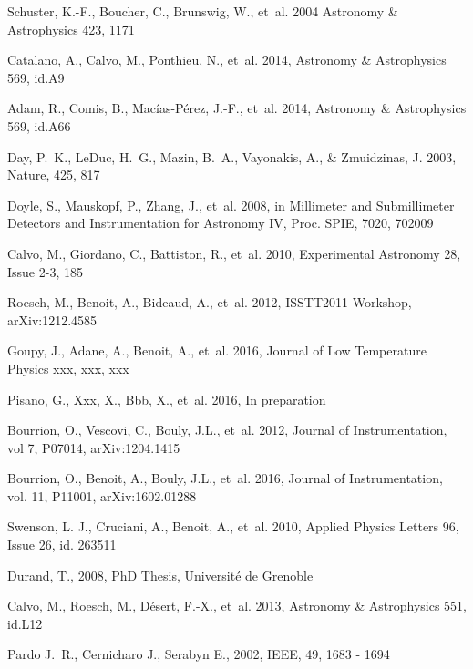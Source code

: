 \begin{thebibliography}{99}
Schuster, K.-F., Boucher, C., Brunswig, W., {et~al.} 2004 
Astronomy \& Astrophysics 423, 1171

Catalano, A., Calvo, M., Ponthieu, N., {et~al.} 2014, 
Astronomy \& Astrophysics 569, id.A9

Adam, R., Comis, B., Mac\'ias-P\'erez, J.-F., {et~al.} 2014, 
Astronomy \& Astrophysics 569, id.A66

Day, P.~K., LeDuc, H.~G., Mazin, B.~A., Vayonakis, A., \& Zmuidzinas, J. 2003,
  Nature, 425, 817

Doyle, S., Mauskopf, P., Zhang, J., {et~al.} 2008{}, in Millimeter
  and Submillimeter Detectors and Instrumentation for Astronomy IV, Proc. SPIE,
  7020, 702009

Calvo, M., Giordano, C., Battiston, R., {et~al.} 2010, 
Experimental Astronomy 28, Issue 2-3, 185

Roesch, M., Benoit, A., Bideaud, A., {et~al.} 2012, 
ISSTT2011 Workshop, arXiv:1212.4585

Goupy, J., Adane, A., Benoit, A., {et~al.} 2016, 
Journal of Low Temperature Physics xxx, xxx, xxx

Pisano, G., Xxx, X., Bbb, X., {et~al.} 2016, 
In preparation

Bourrion, O., Vescovi, C., Bouly, J.L., {et~al.} 2012, 
Journal of Instrumentation, vol 7, P07014, arXiv:1204.1415

Bourrion, O., Benoit, A., Bouly, J.L., {et~al.} 2016, 
Journal of Instrumentation, vol. 11, P11001, arXiv:1602.01288

Swenson, L. J., Cruciani, A., Benoit, A., {et~al.} 2010, 
Applied Physics Letters 96, Issue 26, id. 263511

Durand, T., 2008, 
PhD Thesis, Universit\' e de Grenoble

Calvo, M., Roesch, M., D\'esert, F.-X., {et~al.} 2013, 
Astronomy \& Astrophysics 551, id.L12

Pardo J.~R., Cernicharo J., Serabyn E., 2002, 
IEEE, 49, 1683 - 1694


\end{thebibliography}
